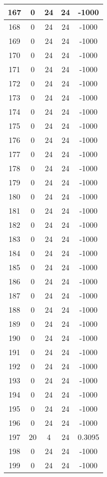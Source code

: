 \documentclass[letterpaper, 12pt]{article}
\begin{document}
\begin{longtable}{|c|c|c|c|c|}
\hline
167 & 0 & 24 & 24 & -1000 \\
\hline
168 & 0 & 24 & 24 & -1000 \\
\hline
169 & 0 & 24 & 24 & -1000 \\
\hline
170 & 0 & 24 & 24 & -1000 \\
\hline
171 & 0 & 24 & 24 & -1000 \\
\hline
172 & 0 & 24 & 24 & -1000 \\
\hline
173 & 0 & 24 & 24 & -1000 \\
\hline
174 & 0 & 24 & 24 & -1000 \\
\hline
175 & 0 & 24 & 24 & -1000 \\
\hline
176 & 0 & 24 & 24 & -1000 \\
\hline
177 & 0 & 24 & 24 & -1000 \\
\hline
178 & 0 & 24 & 24 & -1000 \\
\hline
179 & 0 & 24 & 24 & -1000 \\
\hline
180 & 0 & 24 & 24 & -1000 \\
\hline
181 & 0 & 24 & 24 & -1000 \\
\hline
182 & 0 & 24 & 24 & -1000 \\
\hline
183 & 0 & 24 & 24 & -1000 \\
\hline
184 & 0 & 24 & 24 & -1000 \\
\hline
185 & 0 & 24 & 24 & -1000 \\
\hline
186 & 0 & 24 & 24 & -1000 \\
\hline
187 & 0 & 24 & 24 & -1000 \\
\hline
188 & 0 & 24 & 24 & -1000 \\
\hline
189 & 0 & 24 & 24 & -1000 \\
\hline
190 & 0 & 24 & 24 & -1000 \\
\hline
191 & 0 & 24 & 24 & -1000 \\
\hline
192 & 0 & 24 & 24 & -1000 \\
\hline
193 & 0 & 24 & 24 & -1000 \\
\hline
194 & 0 & 24 & 24 & -1000 \\
\hline
195 & 0 & 24 & 24 & -1000 \\
\hline
196 & 0 & 24 & 24 & -1000 \\
\hline
197 & 20 & 4 & 24 & 0.3095 \\
\hline
198 & 0 & 24 & 24 & -1000 \\
\hline
199 & 0 & 24 & 24 & -1000 \\
\hline
\end{longtable}
\end{document}
